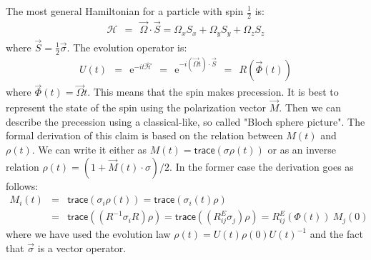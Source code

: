 \documentclass[onecolumn,fleqn]{revtex4}
\newcommand{\trc}{\mathsf{trace}}
\newcommand{\eexp}{\mathrm{e}^}
\newcommand{\beq}{\begin{eqnarray}}
\newcommand{\eeq}{\end{eqnarray}}
\begin{document}
The most general Hamiltonian for a particle with spin $\frac{1}{2}$ is:
\beq
\mathcal{H} \ \ = \ \ \vec{\Omega}\cdot \vec{S}= \Omega_x S_x + \Omega_y S_y + \Omega_z S_z 
\eeq
where ${\vec{S} = \frac{1}{2} \vec{\sigma}}$.
The evolution operator is:
\beq
U(t) \ \ = \ \ \eexp{-it\hat{\mathcal{H}}} \ \ = \ \ \eexp{-i( \vec{\Omega}t)\cdot\vec{S}} \ \ = \ \ R(\vec{\Phi }(t)) 
\eeq
where $\vec{\Phi}(t) = \vec{\Omega}t$. 
This means that the spin makes precession.
It is best to represent the state of the spin 
using the polarization vector $\vec{M}$. 
Then we can describe the precession  
using a classical-like, so called "Bloch sphere picture". 
The formal derivation of this claim is based on the 
relation between $M(t)$ and $\rho(t)$. 
We can write it either as $M(t)=\trc(\sigma\rho(t))$
or as an inverse relation ${\rho(t)=(1+\vec{M}(t)\cdot\sigma)/2}$. 
In the former case the derivation goes as follows:
\beq
M_i(t)&=&\trc(\sigma_i\rho(t)) 
= \trc(\sigma_i(t)\rho) 
\\ \nonumber
&=& \trc((R^{-1} \sigma_i R) \rho) 
= \trc((R^E_{ij} \sigma_j) \rho) 
=  R^E_{ij}(\Phi(t)) \ M_j(0)
\eeq
where we have used the evolution law ${\rho(t)=U(t)\rho(0)U(t)^{-1}}$
and the fact that $\vec{\sigma}$ is a vector operator. 
\end{document}
